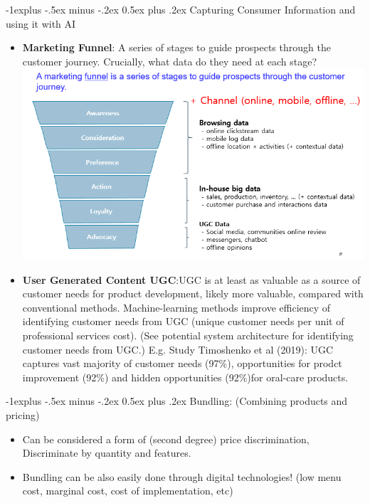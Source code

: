 \documentclass[12pt, landscape]{article}
\makeatletter
\renewcommand{\subsection}{\@startsection{subsection}{2}{0mm}%
                                {-1explus -.5ex minus -.2ex}%
                                {0.5ex plus .2ex}%
                                {\normalfont\normalsize\bfseries}}
\makeatother
\begin{document}
\begin{multicols*}{3}
\subsection{Capturing Consumer Information and using it with AI }
\begin{itemize}
\item \textbf{Marketing Funnel}: A series of stages to guide prospects through the customer journey. Crucially, what data do they need at each stage?
\includegraphics[width = \linewidth]{marketingFunnel}
\item \textbf{User Generated Content UGC}:UGC is at least as valuable as a source of customer needs for product development, likely more valuable, compared with conventional methods. Machine-learning methods improve efficiency of identifying customer needs from UGC (unique customer needs per unit of professional services cost). (See potential system architecture for identifying customer needs from UGC.) E.g. Study Timoshenko et al (2019): UGC captures vast majority of customer needs (97\%), opportunities for prodct improvement (92\%) and hidden opportunities (92\%)for oral-care products.
\end{itemize}

\subsection{Bundling: (Combining products and pricing)}
\begin{itemize}
\item Can be considered a form of (second degree) price discrimination, Discriminate by quantity and features. 
\item Bundling can be also easily done through digital technologies! (low menu cost, marginal cost, cost of implementation, etc)
\end{itemize}


\end{multicols*}
\end{document}
